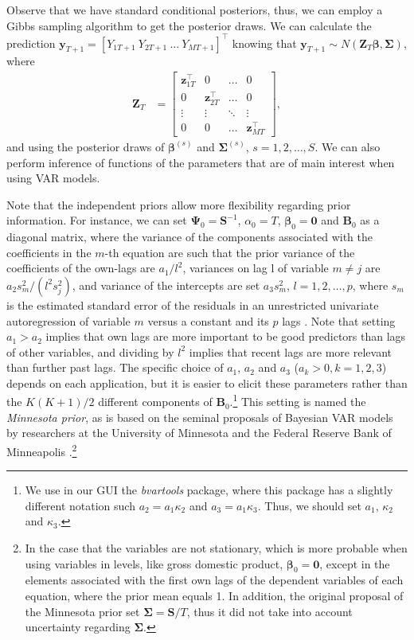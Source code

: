 Observe that we have standard conditional posteriors, thus, we can employ a Gibbs sampling algorithm to get the posterior draws. We can calculate the prediction $\bm{y}_{T+1}=[Y_{1T+1} \ Y_{2T+1} \ \dots \ Y_{MT+1}]^{\top}$ knowing that $\bm{y}_{T+1}\sim N(\bm{Z}_{T}\bm{\beta},\bm{\Sigma})$, where \begin{align*}
	\bm{Z}_T&=\begin{bmatrix}
		\bm{z}_{1T}^{\top} & 0 & \dots & 0\\
		0 & \bm{z}_{2T}^{\top} & \dots & 0\\
		\vdots & \vdots & \ddots & \vdots\\
		0 & 0& \dots & \bm{z}_{MT}^{\top}		
	\end{bmatrix},
\end{align*} 
and using the posterior draws of $\bm{\beta}^{(s)}$ and $\bm{\Sigma}^{(s)}$, $s=1,2,\dots,S$. We can also perform inference of functions of the parameters that are of main interest when using VAR models.

Note that the independent priors allow more flexibility regarding prior information. For instance, we can set $\bm{\Psi}_0 = \bm{S}^{-1}$, $\alpha_0=T$, $\bm{\beta}_0=\bm{0}$ and $\bm{B}_0$ as a diagonal matrix, where the variance of the components associated with the coefficients in the $m$-th equation are such that the prior variance of the coefficients of the own-lags are $a_1/l^2$, variances on lag l of variable $m\neq j$ are $a_2s_{m}^2/(l^2s_{j}^2)$, and variance of the intercepts are set $a_3s_{m}^2$, $l=1,2,\dots,p$, where $s_{m}$ is the estimated standard error of the residuals in an unrestricted univariate autoregression of variable $m$ versus a constant and its $p$ lags \cite{litterman1986forecasting,koop2010bayesian}. Note that setting $a_1>a_2$ implies that own lags are more important to be good predictors than lags of other variables, and dividing by $l^2$ implies that recent lags are more relevant than further past lags. The specific choice of $a_1$, $a_2$ and $a_3$ ($a_k>0,k=1,2,3$) depends on each application, but it is easier to elicit these parameters rather than the $K(K+1)/2$ different components of $\bm{B}_0$.\footnote{We use in our GUI the \textit{bvartools} package, where this package has a slightly different notation such $a_2=a_1\kappa_2$ and $a_3=a_1\kappa_3$. Thus, we should set $a_1$, $\kappa_2$ and $\kappa_3$.} This setting is named the \textit{Minnesota prior}, as is based on the seminal proposals of Bayesian VAR models by researchers at the University of Minnesota and the Federal Reserve Bank of Minneapolis \cite{doan1984forecasting,litterman1986forecasting}.\footnote{In the case that the variables are not stationary, which is more probable when using variables in levels, like gross domestic product, $\bm{\beta}_0=\bm{0}$, except in the elements associated with the first own lags of the dependent variables of each equation, where the prior mean equals 1. In addition, the original proposal of the Minnesota prior set $\bm{\Sigma} = \bm{S}/T$, thus it did not take into account uncertainty regarding $\bm{\Sigma}$.} 

